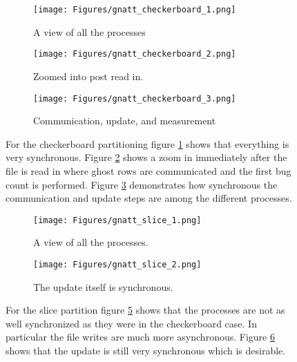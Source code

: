 \documentclass[11pt,a4paper,oneside]{report}
\begin{document}
\begin{figure}[htpb]
  \centering
  \begin{subfigure}[b]{0.5\textwidth}
    \centering
    \texttt{[image: Figures/gnatt\_checkerboard\_1.png]}
    \caption{A view of all the processes}
    \label{fig:check1}
  \end{subfigure}%
  \begin{subfigure}[b]{0.5\textwidth}
    \centering
    \texttt{[image: Figures/gnatt\_checkerboard\_2.png]}
    \caption{Zoomed into post read in.}
    \label{fig:check2}
  \end{subfigure}
  \begin{subfigure}[b]{0.5\textwidth}
    \centering
    \texttt{[image: Figures/gnatt\_checkerboard\_3.png]}
    \caption{Communication, update, and measurement}
    \label{fig:check3}
  \end{subfigure}%
  \caption{For the checkerboard partitioning figure \ref{fig:check1} shows that everything is very synchronous.  Figure \ref{fig:check2} shows a zoom in immediately after the file is read in where ghost rows are communicated and the first bug count is performed.  Figure \ref{fig:check3} demonstrates how synchronous the communication and update steps are among the different processes.}\label{fig:checkerboard}
\end{figure}

\begin{figure}[htpb]
  \centering
  \begin{subfigure}[b]{0.5\textwidth}
    \centering
    \texttt{[image: Figures/gnatt\_slice\_1.png]}
    \caption{A view of all the processes.}
    \label{fig:slice1}
  \end{subfigure}%
  \begin{subfigure}[b]{0.5\textwidth}
    \centering
    \texttt{[image: Figures/gnatt\_slice\_2.png]}
    \caption{The update itself is synchronous.}
    \label{fig:slice2}
  \end{subfigure}
  \caption{For the slice partition figure \ref{fig:slice1} shows that the processes are not as well synchronized as they were in the checkerboard case.  In particular the file writes are much more asynchronous.  Figure \ref{fig:slice2} shows that the update is still very synchronous which is desirable.}\label{fig:slice}
\end{figure}
\end{document}
